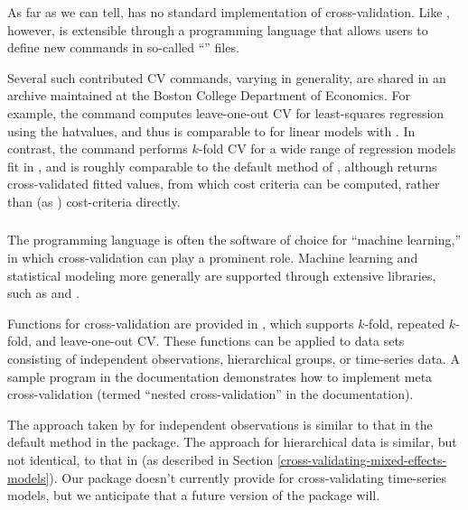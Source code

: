 \documentclass[
]{jss}
\begin{document}
As far as we can tell,  has no standard implementation
of cross-validation. Like , however,  is
extensible through a programming language that allows users to define
new commands in so-called ``'' files.

Several such contributed  CV commands, varying in
generality, are shared in an archive maintained at the Boston College
Department of Economics. For example, the  command
\citep{Rios-Avila:2018} computes leave-one-out CV for least-squares
regression using the hatvalues, and thus is comparable to 
for linear models with . In contrast, the
 command \citep{Schonlau:2020} performs \(k\)-fold
CV for a wide range of regression models fit in , and is
roughly comparable to the default method of , although
 returns cross-validated fitted values, from which
cost criteria can be computed, rather than (as )
cost-criteria directly.

\subsubsection[Python]{}\label{python}

The programming language  is often the software of
choice for ``machine learning,'' in which cross-validation can play a
prominent role. Machine learning and statistical modeling more generally
are supported through extensive  libraries, such as
\citep{Pedregosa-et-al:2011, ScikitLearnDevelopers:2024} and
 \citep[which isn't limited to use within
]{TensorFlow:2015}.

Functions for cross-validation are provided in , which
supports \(k\)-fold, repeated \(k\)-fold, and leave-one-out CV. These
functions can be applied to data sets consisting of independent
observations, hierarchical groups, or time-series data. A sample program
in the  documentation
\citep{ScikitLearnDevelopers:2024} demonstrates how to implement meta
cross-validation (termed ``nested cross-validation'' in the
documentation).

The approach taken by  for independent observations is
similar to that in the default  method in the 
package. The approach for hierarchical data is similar, but not
identical, to that in  (as described in Section
\ref{cross-validating-mixed-effects-models}). Our  package
doesn't currently provide for cross-validating time-series models, but
we anticipate that a future version of the package will.
\end{document}
